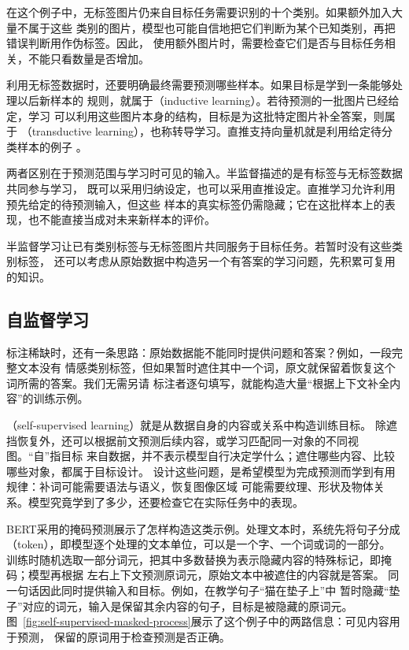 在这个例子中，无标签图片仍来自目标任务需要识别的十个类别。如果额外加入大量不属于这些
类别的图片，模型也可能自信地把它们判断为某个已知类别，再把错误判断用作伪标签。因此，
使用额外图片时，需要检查它们是否与目标任务相关，不能只看数量是否增加。

利用无标签数据时，还要明确最终需要预测哪些样本。如果目标是学到一条能够处理以后新样本的
规则，就属于（inductive learning）。若待预测的一批图片已经给定，学习
可以利用这些图片本身的结构，目标是为这批特定图片补全答案，则属于
（transductive learning），也称转导学习。直推支持向量机就是利用给定待分类样本的例子
。

两者区别在于预测范围与学习时可见的输入。半监督描述的是有标签与无标签数据共同参与学习，
既可以采用归纳设定，也可以采用直推设定。直推学习允许利用预先给定的待预测输入，但这些
样本的真实标签仍需隐藏；它在这批样本上的表现，也不能直接当成对未来新样本的评价。

半监督学习让已有类别标签与无标签图片共同服务于目标任务。若暂时没有这些类别标签，
还可以考虑从原始数据中构造另一个有答案的学习问题，先积累可复用的知识。

\subsection{自监督学习}
\label{sec:self-supervised-learning}

标注稀缺时，还有一条思路：原始数据能不能同时提供问题和答案？例如，一段完整文本没有
情感类别标签，但如果暂时遮住其中一个词，原文就保留着恢复这个词所需的答案。我们无需另请
标注者逐句填写，就能构造大量“根据上下文补全内容”的训练示例。

（self-supervised learning）就是从数据自身的内容或关系中构造训练目标。
除遮挡恢复外，还可以根据前文预测后续内容，或学习匹配同一对象的不同视图。“自”指目标
来自数据，并不表示模型自行决定学什么；遮住哪些内容、比较哪些对象，都属于目标设计。
设计这些问题，是希望模型为完成预测而学到有用规律：补词可能需要语法与语义，恢复图像区域
可能需要纹理、形状及物体关系。模型究竟学到了多少，还要检查它在实际任务中的表现。

BERT采用的掩码预测展示了怎样构造这类示例。处理文本时，系统先将句子分成
（token），即模型逐个处理的文本单位，可以是一个字、一个词或词的一部分。
训练时随机选取一部分词元，把其中多数替换为表示隐藏内容的特殊标记，即掩码；模型再根据
左右上下文预测原词元，原始文本中被遮住的内容就是答案。
同一句话因此同时提供输入和目标。例如，在教学句子“猫在垫子上”中
暂时隐藏“垫子”对应的词元，输入是保留其余内容的句子，目标是被隐藏的原词元。
图~\ref{fig:self-supervised-masked-process}展示了这个例子中的两路信息：可见内容用于预测，
保留的原词用于检查预测是否正确。

